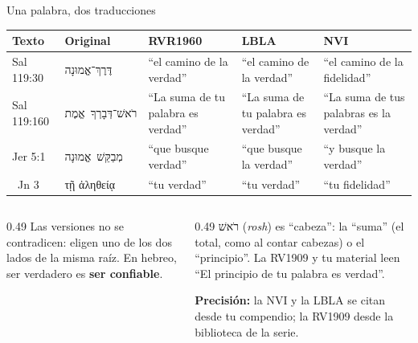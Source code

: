\documentclass[hyperref={bookmarks=false},aspectratio=169]{beamer}
\newcommand{\heb}[1]{\mbox{\foreignlanguage{hebrew}{#1}}}
\newcommand{\grc}[1]{\foreignlanguage{ancientgreek}{#1}}
\newcommand{\destacar}[1]{\textbf{\textcolor{azul}{#1}}}
\newcommand{\precision}[1]{{\footnotesize\color{gris}\textbf{Precisión:} #1}}
\begin{document}
\begin{frame}{Una palabra, dos traducciones}
\scriptsize\renewcommand{\arraystretch}{1.2}
\begin{tabular}{@{}>{\RaggedRight\arraybackslash}p{1.5cm}>{\RaggedRight\arraybackslash}p{1.7cm}>{\RaggedRight\arraybackslash}p{2.9cm}>{\RaggedRight\arraybackslash}p{2.6cm}>{\RaggedRight\arraybackslash}p{2.8cm}@{}}
\toprule
\textbf{Texto} & \textbf{Original} & \textbf{RVR1960} & \textbf{LBLA} & \textbf{NVI} \\ \midrule
Sal 119:30 & \heb{דֶּרֶךְ־אֱמוּנָה} & ``el camino de la verdad'' & ``el camino de la verdad'' & ``el camino de la fidelidad'' \\
Sal 119:160 & \heb{רֹאשׁ־דְּבָרְךָ אֱמֶת} & ``La suma de tu palabra es verdad'' & ``La suma de tu palabra es verdad'' & ``La suma de tus palabras es la verdad'' \\
Jer 5:1 & \heb{מְבַקֵּשׁ אֱמוּנָה} & ``que busque verdad'' & ``que busque la verdad'' & ``y busque la verdad'' \\
3~Jn 3 & \grc{τῇ ἀληθείᾳ} & ``tu verdad'' & ``tu verdad'' & ``tu fidelidad'' \\
\bottomrule
\end{tabular}\par\medskip
\begin{columns}[t,onlytextwidth]
\begin{column}{0.49\textwidth}\small
Las versiones no se contradicen: eligen uno de los dos lados de la misma raíz. En hebreo, ser verdadero es \destacar{ser confiable}.
\end{column}
\begin{column}{0.49\textwidth}\scriptsize
\heb{רֹאשׁ} (\emph{rosh}) es ``cabeza'': la ``suma'' (el total, como al contar cabezas) o el ``principio''. La RV1909 y tu material leen ``El principio de tu palabra es verdad''.\par\smallskip
\precision{la NVI y la LBLA se citan desde tu compendio; la RV1909 desde la biblioteca de la serie.}
\end{column}
\end{columns}
\end{frame}
\end{document}
